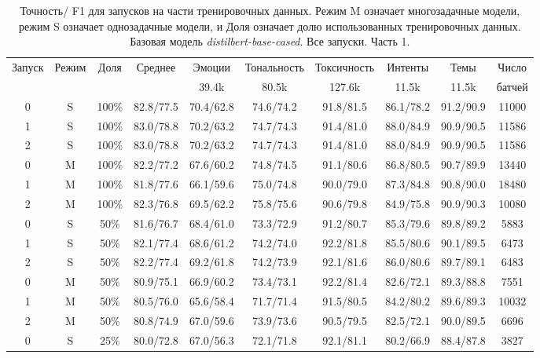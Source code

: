 \begin{table*}
\caption{Точность/ F1 для запусков на части тренировочных данных.  Режим M означает многозадачные модели, режим S означает однозадачные модели, и Доля означает долю использованных тренировочных данных. Базовая модель \textit{distilbert-base-cased}. Все запуски. Часть 1. }%
\label{appendix:tr-ag:en_results_part}
\begin{tabular}{|c|c|c||c|c|c|c|c|c||c|} \hline
 \multirow{2}{*}{Запуск} & \multirow{2}{*}{Режим} &  \multirow{2}{*}{Доля} &\multirow{2}{*}{Среднее} & Эмоции & Тональность & Токсичность & Интенты & Темы & Число \\
& & & & 39.4k & 80.5k & 127.6k & 11.5k & 11.5k & батчей \\ \hline \hline
0 & S & 100\% & 82.8/77.5 & 70.4/62.8 & 74.6/74.2 & 91.8/81.5 & 86.1/78.2 & 91.2/90.9 & 11000 \\ \hline
1 & S & 100\% & 83.0/78.8 & 70.2/63.2 & 74.7/74.3 & 91.4/81.0 & 88.0/84.9 & 90.9/90.5 & 11586 \\ \hline
2 & S & 100\% & 83.0/78.8 & 70.2/63.2 & 74.7/74.3 & 91.4/81.0 & 88.0/84.9 & 90.9/90.5 & 11586 \\ \hline
0 & M & 100\% & 82.2/77.2 & 67.6/60.2 & 74.8/74.5 & 91.1/80.6 & 86.8/80.5 & 90.7/89.9 & 13440 \\ \hline
1 & M & 100\% & 81.8/77.6 & 66.1/59.6 & 75.0/74.8 & 90.0/79.0 & 87.3/84.8 & 90.8/90.0 & 18480 \\ \hline
2 & M & 100\% & 82.3/76.8 & 69.5/62.2 & 75.8/75.6 & 90.6/79.8 & 84.9/75.8 & 90.9/90.3 & 10080 \\ \hline
0 & S & 50\% & 81.6/76.7 & 68.4/61.0 & 73.3/72.9 & 91.2/80.7 & 85.3/79.6 & 89.8/89.2 & 5883 \\ \hline
1 & S & 50\% & 82.1/77.4 & 68.6/61.2 & 74.2/74.0 & 92.2/81.8 & 85.5/80.6 & 90.1/89.5 & 6473 \\ \hline
2 & S & 50\% & 82.2/77.4 & 69.2/61.8 & 74.2/73.9 & 92.1/81.6 & 86.0/80.6 & 89.7/89.1 & 6483 \\ \hline
0 & M & 50\% & 80.9/75.1 & 66.9/60.2 & 73.4/73.1 & 92.2/81.4 & 82.6/72.1 & 89.3/88.8 & 7551 \\ \hline
1 & M & 50\% & 80.5/76.0 & 65.6/58.4 & 71.7/71.4 & 91.5/80.5 & 84.2/80.2 & 89.6/89.3 & 10032 \\ \hline
2 & M & 50\% & 80.8/74.9 & 67.0/59.6 & 73.9/73.6 & 90.5/79.5 & 82.5/72.1 & 90.0/89.5 & 6696 \\ \hline
0 & S & 25\% & 80.0/72.8 & 67.0/56.3 & 72.1/71.8 & 92.1/81.1 & 80.2/66.9 & 88.4/87.8 & 3827 \\ \hline

\end{tabular}
\end{table*}
